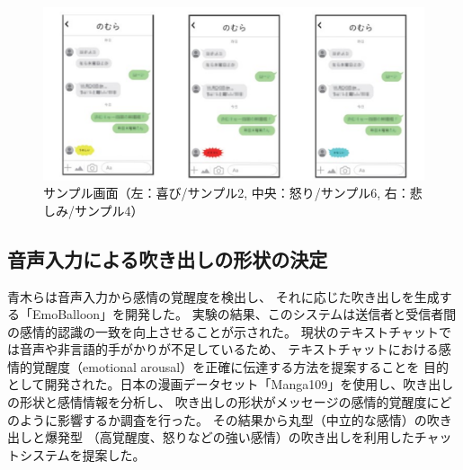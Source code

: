 \documentclass[11pt,a4paper]{ltjsreport}
\begin{document}
\begin{figure}[htbp]
    \begin{center}
        \includegraphics[width=150mm]{PDF/gazou_1.pdf}
        \caption{サンプル画面（左：喜び/サンプル2, 中央：怒り/サンプル6, 右：悲しみ/サンプル4）}
        \label{figure:gazou1}
    \end{center}
\end{figure}

\subsection{音声入力による吹き出しの形状の決定}
青木ら\cite{Thesis_Aoki}は音声入力から感情の覚醒度を検出し、
それに応じた吹き出しを生成する「EmoBalloon」を開発した。
実験の結果、このシステムは送信者と受信者間の感情的認識の一致を向上させることが示された。
現状のテキストチャットでは音声や非言語的手がかりが不足しているため、
テキストチャットにおける感情的覚醒度（emotional arousal）を正確に伝達する方法を提案することを
目的として開発された。日本の漫画データセット「Manga109」を使用し、吹き出しの形状と感情情報を分析し、
吹き出しの形状がメッセージの感情的覚醒度にどのように影響するか調査を行った。
その結果から丸型（中立的な感情）の吹き出しと爆発型
（高覚醒度、怒りなどの強い感情）の吹き出しを利用したチャットシステムを提案した。


\end{document}
